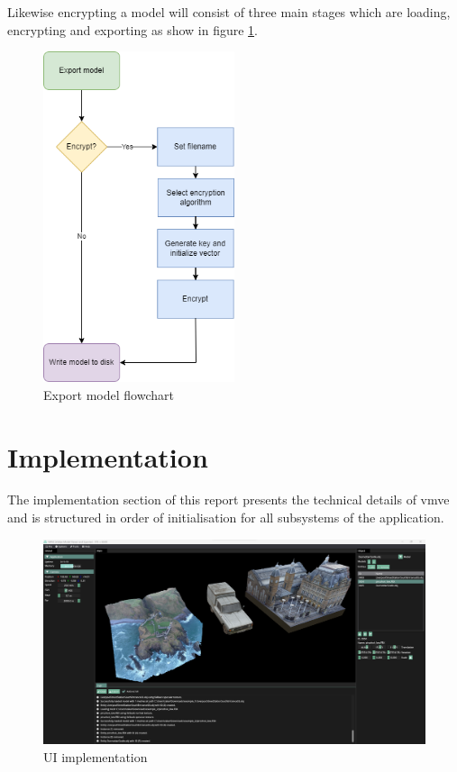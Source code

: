 \documentclass[11pt]{article}
\begin{document}
Likewise encrypting a model will consist of three main stages which are loading,
encrypting and exporting as show in figure \ref{fig:export_model_flowchart}.
\begin{figure}[H]
  \centering
  \includegraphics[width=0.5\textwidth]{images/export_model_flowchart.png}
  \caption{Export model flowchart}
  \label{fig:export_model_flowchart}
\end{figure}

\clearpage
\section{Implementation} \label{implementation}

The implementation section of this report presents the technical details of
\gls*{vmve} and is structured in order of initialisation for all subsystems of
the application.

\begin{figure}[H]
  \centering
  \includegraphics[width=\textwidth]{images/ui_implementation.png}
  \caption{UI implementation}
  \label{fig:user_interface}
\end{figure}
\end{document}
